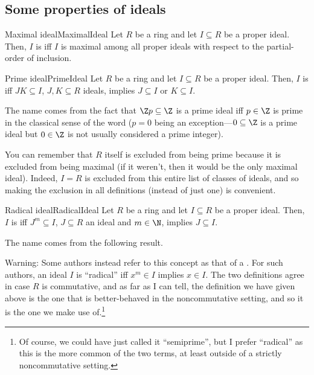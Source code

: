 \subsection{Some properties of ideals}

\begin{dfn}{Maximal ideal}{MaximalIdeal}
	Let $R$ be a ring and let $I\subseteq R$ be a proper ideal.  Then, $I$ is  iff $I$ is maximal among all proper ideals with respect to the partial-order of inclusion.
\end{dfn}
\begin{dfn}{Prime ideal}{PrimeIdeal}
	Let $R$ be a ring and let $I\subseteq R$ be a proper ideal.  Then, $I$ is  iff $JK\subseteq I$, $J,K\subseteq R$ ideals, implies $J\subseteq I$ or $K\subseteq I$.
	\begin{rmk}
		The name comes from the fact that $\Z p\subseteq \Z$ is a prime ideal iff $p\in \Z$ is prime in the classical sense of the word ($p=0$ being an exception---$0\subseteq \Z$ is a prime ideal but $0\in \Z$ is not usually considered a prime integer).
	\end{rmk}
	\begin{rmk}
		You can remember that $R$ itself is excluded from being prime because it is excluded from being maximal (if it weren't, then it would be the only maximal ideal).  Indeed, $I=R$ is excluded from this entire list of classes of ideals, and so making the exclusion in all definitions (instead of just one) is convenient.
	\end{rmk}
\end{dfn}
\begin{dfn}{Radical ideal}{RadicalIdeal}
	Let $R$ be a ring and let $I\subseteq R$ be a proper ideal.  Then, $I$ is  iff $J^m\subseteq I$, $J\subseteq R$ an ideal and $m\in \N$, implies $J\subseteq I$.
	\begin{rmk}
		The name comes from the following result.
	\end{rmk}
	\begin{rmk}
		Warning:  Some authors instead refer to this concept as that of a .  For such authors, an ideal $I$ is ``radical'' iff $x^m\in I$ implies $x\in I$.  The two definitions agree in case $R$ is commutative, and as far as I can tell, the definition we have given above is the one that is better-behaved in the noncommutative setting, and so it is the one we make use of.\footnote{Of course, we could have just called it ``semiprime'', but I prefer ``radical'' as this is the more common of the two terms, at least outside of a strictly noncommutative setting.}
	\end{rmk}
\end{dfn}

